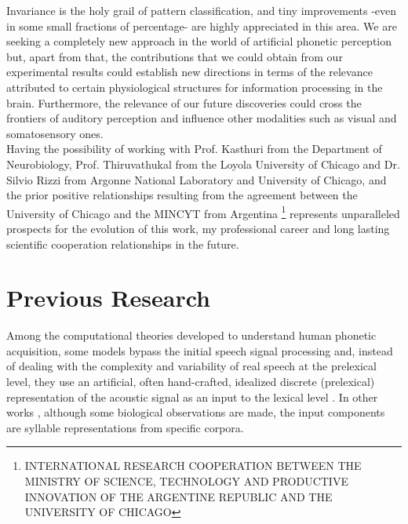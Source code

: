 \documentclass[11pt,a4paper]{article}
\begin{document}
Invariance is the holy grail of pattern classification,
and tiny improvements -even in some small fractions
of percentage- are highly appreciated in this area.
We are seeking a completely new approach in the world of
artificial phonetic perception but, apart from that,
the contributions that we could obtain from our
experimental results could establish new directions
in terms of the relevance attributed
to certain physiological
structures for information processing in the brain.
Furthermore, the relevance of our future discoveries
could cross the frontiers of auditory perception
and influence other modalities
such as visual and somatosensory ones. \\

Having the possibility of working with Prof.
Kasthuri from the Department of Neurobiology,
Prof. Thiruvathukal from the Loyola University of Chicago and
Dr. Silvio Rizzi from Argonne National Laboratory and University of Chicago,
and the prior positive relationships resulting from the agreement
between the University of Chicago and the MINCYT from Argentina
\footnote{INTERNATIONAL RESEARCH COOPERATION BETWEEN THE MINISTRY OF SCIENCE,
TECHNOLOGY AND PRODUCTIVE INNOVATION
OF THE ARGENTINE REPUBLIC
AND
THE UNIVERSITY OF CHICAGO}
represents unparalleled prospects for the
evolution of this work, my professional career
and long lasting scientific cooperation
relationships in the future. \\
























\section{Previous Research}

Among the computational theories developed to understand
human phonetic acquisition, some models bypass the initial
speech signal processing and,
instead of dealing with the complexity and variability of real speech
at the prelexical level, they use an artificial, often hand-crafted, 
idealized discrete (prelexical) representation of the acoustic
signal as an input to the lexical level \cite{scharenborg_2010}.
In other works \cite{dominey_2000}, although some biological observations are made,
the input components are syllable representations from specific corpora.\\
\end{document}
